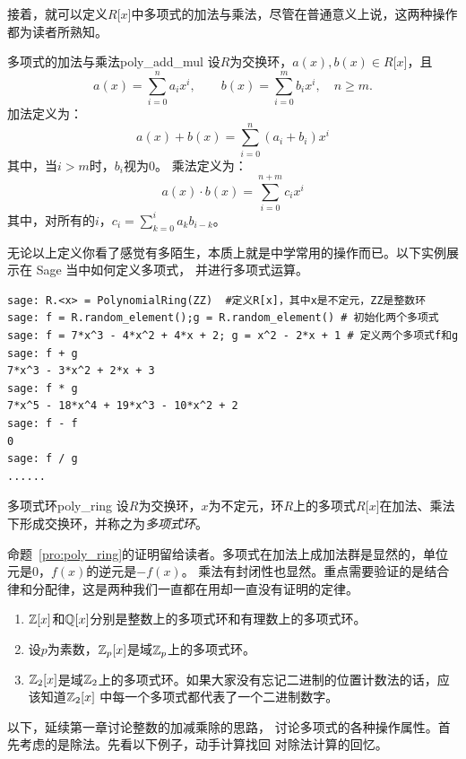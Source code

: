 接着，就可以定义$R\lbrack x\rbrack$中多项式的加法与乘法，尽管在普通意义上说，这两种操作都为读者所熟知。
\begin{definition}{多项式的加法与乘法}{poly_add_mul}
设$R$为交换环，$a(x), b(x) \in R\lbrack x\rbrack$，且
\[ a(x) = \sum_{i=0}^n a_i x^i , \qquad  b(x) = \sum_{i=0}^m b_i x^i, \quad n \geq m.\]
加法定义为：
\[a(x) + b(x) = \sum_{i = 0}^n (a_i + b_i) x^i\]
其中，当$i > m$时，$b_i$视为$0$。
乘法定义为：
\[a(x) \cdot b(x) = \sum_{i = 0}^{n+m} c_i x^i\]
其中，对所有的$i$，$c_i = \sum_{k = 0}^i a_k b_{i-k}$。
\end{definition}

\begin{example}
无论以上定义你看了感觉有多陌生，本质上就是中学常用的操作而已。以下实例展示在 Sage 当中如何定义多项式，
并进行多项式运算。
\begin{lstlisting}
sage: R.<x> = PolynomialRing(ZZ)  #定义R[x]，其中x是不定元，ZZ是整数环
sage: f = R.random_element();g = R.random_element() # 初始化两个多项式
sage: f = 7*x^3 - 4*x^2 + 4*x + 2; g = x^2 - 2*x + 1 # 定义两个多项式f和g
sage: f + g
7*x^3 - 3*x^2 + 2*x + 3
sage: f * g
7*x^5 - 18*x^4 + 19*x^3 - 10*x^2 + 2
sage: f - f
0
sage: f / g
......
\end{lstlisting}
\end{example}

\begin{proposition}{多项式环}{poly_ring}
设$R$为交换环，$x$为不定元，环$R$上的多项式$R\lbrack x\rbrack$在加法、乘法下形成交换环，并称之为\emph{多项式环}。
\end{proposition}
命题~\ref{pro:poly_ring}的证明留给读者。多项式在加法上成加法群是显然的，单位元是$0$，$f(x)$的逆元是$-f(x)$。
乘法有封闭性也显然。重点需要验证的是结合律和分配律，这是两种我们一直都在用却一直没有证明的定律。

\begin{example}
\begin{enumerate}
\item ${\mathbb Z}\lbrack x \rbrack$和${\mathbb Q} \lbrack x \rbrack$分别是整数上的多项式环和有理数上的多项式环。

\item 设$p$为素数，${\mathbb Z}_p\lbrack x \rbrack$是域${\mathbb Z}_p$上的多项式环。

\item ${\mathbb Z}_2\lbrack x \rbrack$是域${\mathbb Z}_2$上的多项式环。如果大家没有忘记二进制的位置计数法的话，应该知道${\mathbb Z}_2\lbrack x \rbrack$
中每一个多项式都代表了一个二进制数字。

\end{enumerate}
\end{example}
以下，延续第一章讨论整数的加减乘除的思路，
讨论多项式的各种操作属性。首先考虑的是除法。先看以下例子，动手计算找回
对除法计算的回忆。

